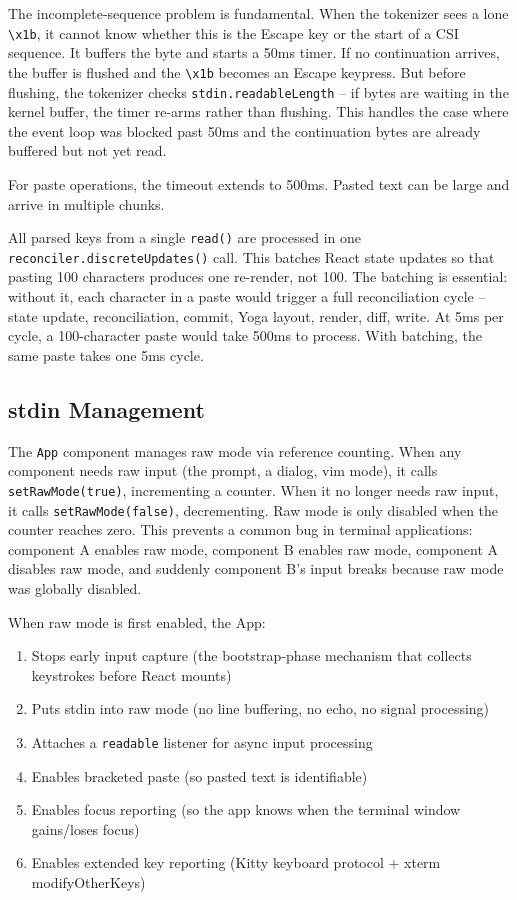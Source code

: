 \documentclass[
  english,
  11pt,
  letterpaper,
]{book}
\providecommand{\tightlist}{%
  \setlength{\itemsep}{0pt}\setlength{\parskip}{0pt}}
\begin{document}
The incomplete-sequence problem is fundamental. When the tokenizer sees
a lone \texttt{\textbackslash{}x1b}, it cannot know whether this is the
Escape key or the start of a CSI sequence. It buffers the byte and
starts a 50ms timer. If no continuation arrives, the buffer is flushed
and the \texttt{\textbackslash{}x1b} becomes an Escape keypress. But
before flushing, the tokenizer checks \texttt{stdin.readableLength} --
if bytes are waiting in the kernel buffer, the timer re-arms rather than
flushing. This handles the case where the event loop was blocked past
50ms and the continuation bytes are already buffered but not yet read.

For paste operations, the timeout extends to 500ms. Pasted text can be
large and arrive in multiple chunks.

All parsed keys from a single \texttt{read()} are processed in one
\texttt{reconciler.discreteUpdates()} call. This batches React state
updates so that pasting 100 characters produces one re-render, not 100.
The batching is essential: without it, each character in a paste would
trigger a full reconciliation cycle -- state update, reconciliation,
commit, Yoga layout, render, diff, write. At 5ms per cycle, a
100-character paste would take 500ms to process. With batching, the same
paste takes one 5ms cycle.

\subsection{stdin Management}\label{stdin-management}

The \texttt{App} component manages raw mode via reference counting. When
any component needs raw input (the prompt, a dialog, vim mode), it calls
\texttt{setRawMode(true)}, incrementing a counter. When it no longer
needs raw input, it calls \texttt{setRawMode(false)}, decrementing. Raw
mode is only disabled when the counter reaches zero. This prevents a
common bug in terminal applications: component A enables raw mode,
component B enables raw mode, component A disables raw mode, and
suddenly component B's input breaks because raw mode was globally
disabled.

When raw mode is first enabled, the App:

\begin{enumerate}
\def\labelenumi{\arabic{enumi}.}
\tightlist
\item
  Stops early input capture (the bootstrap-phase mechanism that collects
  keystrokes before React mounts)
\item
  Puts stdin into raw mode (no line buffering, no echo, no signal
  processing)
\item
  Attaches a \texttt{readable} listener for async input processing
\item
  Enables bracketed paste (so pasted text is identifiable)
\item
  Enables focus reporting (so the app knows when the terminal window
  gains/loses focus)
\item
  Enables extended key reporting (Kitty keyboard protocol + xterm
  modifyOtherKeys)
\end{enumerate}
\end{document}
